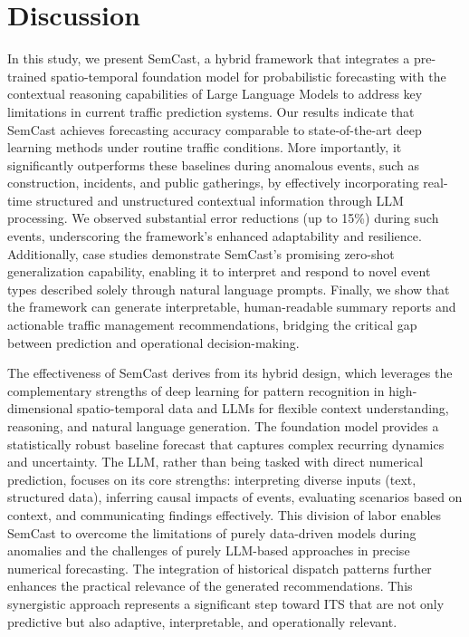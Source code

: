 \documentclass{article}
\begin{document}
\section{Discussion}
In this study, we present SemCast, a hybrid framework that integrates a pre-trained spatio-temporal foundation model for probabilistic forecasting with the contextual reasoning capabilities of Large Language Models to address key limitations in current traffic prediction systems. Our results indicate that SemCast achieves forecasting accuracy comparable to state-of-the-art deep learning methods under routine traffic conditions. More importantly, it significantly outperforms these baselines during anomalous events, such as construction, incidents, and public gatherings, by effectively incorporating real-time structured and unstructured contextual information through LLM processing. We observed substantial error reductions (up to 15\%) during such events, underscoring the framework's enhanced adaptability and resilience. Additionally, case studies demonstrate SemCast's promising zero-shot generalization capability, enabling it to interpret and respond to novel event types described solely through natural language prompts. Finally, we show that the framework can generate interpretable, human-readable summary reports and actionable traffic management recommendations, bridging the critical gap between prediction and operational decision-making.

The effectiveness of SemCast derives from its hybrid design, which leverages the complementary strengths of deep learning for pattern recognition in high-dimensional spatio-temporal data and LLMs for flexible context understanding, reasoning, and natural language generation. The foundation model provides a statistically robust baseline forecast that captures complex recurring dynamics and uncertainty. The LLM, rather than being tasked with direct numerical prediction, focuses on its core strengths: interpreting diverse inputs (text, structured data), inferring causal impacts of events, evaluating scenarios based on context, and communicating findings effectively. This division of labor enables SemCast to overcome the limitations of purely data-driven models during anomalies and the challenges of purely LLM-based approaches in precise numerical forecasting. The integration of historical dispatch patterns further enhances the practical relevance of the generated recommendations. This synergistic approach represents a significant step toward ITS that are not only predictive but also adaptive, interpretable, and operationally relevant.
\end{document}

